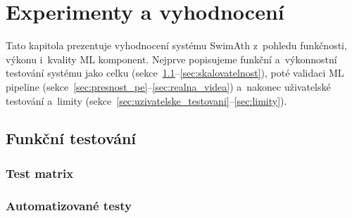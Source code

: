 \chapter{Experimenty a vyhodnocení}
\label{ch:experimenty}

Tato kapitola prezentuje vyhodnocení systému SwimAth z~pohledu funkčnosti, výkonu i~kvality ML komponent.
Nejprve popisujeme funkční a~výkonnostní testování systému jako celku (sekce~\ref{sec:funkcni_testovani}--\ref{sec:skalovatelnost}),
poté validaci ML pipeline (sekce~\ref{sec:presnost_pe}--\ref{sec:realna_videa})
a~nakonec uživatelské testování a~limity (sekce~\ref{sec:uzivatelske_testovani}--\ref{sec:limity}).


\section{Funkční testování}
\label{sec:funkcni_testovani}


\subsection{Test matrix}


\subsection{Automatizované testy}

